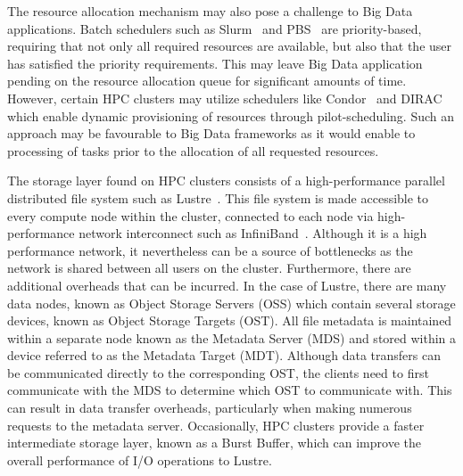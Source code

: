\documentclass{report}
\begin{document}
    The resource allocation mechanism may also pose a challenge to Big Data applications.
    Batch schedulers such as Slurm~\cite{slurm} and PBS~\cite{pbs} 
    are priority-based, requiring that not only all required resources are available,
    but also that the user has satisfied the priority requirements. This may leave
    Big Data application pending on the resource allocation queue for significant amounts
    of time. However, certain HPC clusters may utilize schedulers like Condor~\cite{condor}
    and DIRAC~\cite{dirac} which enable dynamic provisioning of resources through pilot-scheduling.
    Such an approach may be favourable to Big Data frameworks as it would enable to processing
    of tasks prior to the allocation of all requested resources.

    The storage layer found on HPC clusters consists of a high-performance parallel 
    distributed file system such as Lustre~\cite{lustre}. This file system is made 
    accessible to every compute node within the cluster, connected to each node via
    high-performance network interconnect such as InfiniBand~\cite{infiniband}. Although 
    it is a high performance network, it nevertheless can be a source of bottlenecks as 
    the network is shared between all users on the cluster. Furthermore, there are
    additional overheads that can be incurred. In the case of Lustre,
    there are many data nodes, known as Object Storage Servers (OSS) which contain
    several storage devices, known as Object Storage Targets (OST). All file metadata
    is maintained within a separate node known as the Metadata Server (MDS) and stored within
    a device referred to as the Metadata Target (MDT). Although data transfers can be
    communicated directly to the corresponding OST, the clients need to first communicate
    with the MDS to determine which OST to communicate with. This can result
    in data transfer overheads, particularly when making numerous requests to the metadata server.
    Occasionally, HPC clusters provide a faster intermediate storage layer, known as a Burst Buffer,
    which can improve the overall performance of I/O operations to Lustre.
\end{document}
